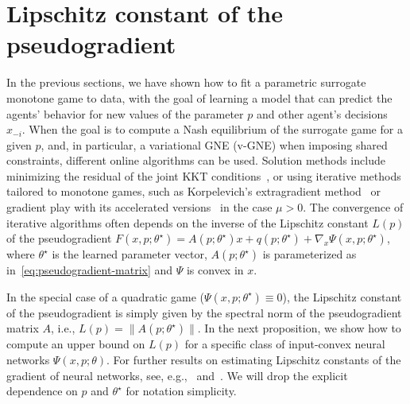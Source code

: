 \documentclass[11pt, a4paper]{article}
\theoremstyle{remark}
\theoremstyle{plain}
\begin{document}
\section{Lipschitz constant of the pseudogradient}
\label{sec:lipschitz}
In the previous sections, we have shown how to fit a parametric surrogate monotone game to data, with the goal of learning a model that can predict the agents' behavior for new values of the parameter $p$ and other agent's decisions $x_{-i}$. When the goal is to compute a Nash equilibrium of the surrogate game for a given $p$, and, in particular, a variational GNE (v-GNE) when imposing shared constraints, different online algorithms can be used. 
Solution methods include minimizing the residual of the joint KKT conditions~\cite[Sect. 3.1]{Bem25}, or using iterative methods tailored to monotone games, such as Korpelevich's extragradient method~\cite{Kor76} or gradient play with its accelerated versions~\cite{NS11,KLL22} in the case $\mu>0$. The convergence of iterative algorithms often depends on the inverse of the Lipschitz constant $L(p)$ of the pseudogradient $F(x,p;\theta^\star)=A(p;\theta^\star)x+q(p;\theta^\star)+\nabla_x\Psi(x,p;\theta^\star)$, where $\theta^\star$ is the learned parameter vector, $A(p;\theta^\star)$ is parameterized as in~\eqref{eq:pseudogradient-matrix} and $\Psi$ is convex in $x$. 

In the special case of a quadratic game ($\Psi(x,p;\theta^\star)\equiv 0$), the Lipschitz constant of the pseudogradient is simply given by the spectral norm of the pseudogradient matrix $A$, i.e., $L(p)=\|A(p;\theta^\star)\|$. In the next proposition, we show how to compute an upper bound on $L(p)$ for a specific class of input-convex neural networks $\Psi(x,p;\theta)$. 
For further results on estimating Lipschitz constants of the gradient of neural networks, see, e.g.,~\cite[Theorem 4]{SF20} and~\cite{ESF24}. We will drop the explicit dependence on $p$ and $\theta^\star$ for notation simplicity.
\end{document}

